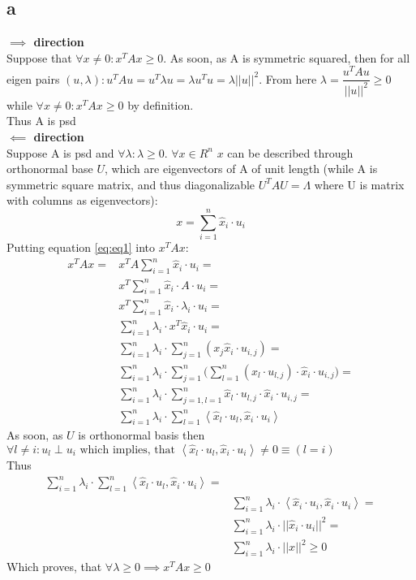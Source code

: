 \subsection*{a}
\textbf{$\implies$ direction}\\
Suppose that $\forall x \neq 0: x^T A x\geq 0$. As soon, as A is symmetric squared, then for all 
eigen pairs $(u,\lambda) : u^T A u = u^T \lambda u = \lambda u^Tu = \lambda ||u||^2$.
From here $\lambda = \dfrac{u^T A u}{||u||^2} \geq 0$ while  $\forall x \neq 0: x^T A x\geq 0$ 
by definition.\\
Thus A is psd\\
\textbf{$\impliedby$ direction}\\
Suppose A is psd and $\forall \lambda: \lambda \geq 0$.
$\forall x \in R^n$ $x$ can be described through orthonormal base $U$, which are eigenvectors
of A of unit length (while A is symmetric square matrix, and thus diagonalizable $U^TAU = \Lambda$
where U is matrix with columns as eigenvectors):
\begin{equation}
	x = \sum_{i=1}^n{\hat{x}_i \cdot u_i}\label{eq:eq1}
\end{equation}
Putting equation \eqref{eq:eq1} into $x^TAx$:
\begin{equation*}
	\begin{aligned}
		x^T A x = & x^T A \sum_{i=1}^n{\hat{x}_i \cdot u_i} = \\
		& x^T \sum_{i=1}^n{\hat{x}_i \cdot A\cdot u_i} = \\
		& x^T \sum_{i=1}^n{\hat{x}_i \cdot \lambda_i\cdot u_i}= \\
		& \sum_{i=1}^n{\lambda_i\cdot x^T \hat{x}_i \cdot  u_i} = \\
		& \sum_{i=1}^n\lambda_i\cdot \sum_{j=1}^n (x_j \hat{x}_i \cdot  u_{i,j}) = \\
		& \sum_{i=1}^n{\lambda_i\cdot \sum_{j=1}^n (\sum_{l=1}^n
			(\hat{x}_l\cdot u_{l,j}) \cdot \hat{x}_i \cdot  u_{i,j}})=\\ 
		& \sum_{i=1}^n{\lambda_i\cdot \sum_{j=1, l=1}^n \hat{x}_l\cdot u_{l,j} \cdot \hat{x}_i \cdot  u_{i,j}} = \\
		& \sum_{i=1}^n{\lambda_i\cdot \sum_{l=1}^n \left<\hat{x}_l\cdot u_l ,\hat{x}_i \cdot  u_i\right>}
	\end{aligned}
\end{equation*}
As soon, as $U$ is orthonormal basis then $\forall l \neq i: u_l \perp u_i 
\text{ which implies, that }  \left<\hat{x}_l\cdot u_l ,\hat{x}_i \cdot  u_i\right> \neq 0 \equiv (l = i)$\\ 
Thus 
\begin{align*}
 	\sum_{i=1}^n{\lambda_i\cdot \sum_{l=1}^n \left<\hat{x}_l\cdot u_l ,\hat{x}_i \cdot  u_i\right>} =\\
		&\sum_{i=1}^n{\lambda_i\cdot \left<\hat{x}_i\cdot u_i ,\hat{x}_i \cdot  u_i\right>}=\\
		&\sum_{i=1}^n\lambda_i\cdot ||\hat{x}_i \cdot u_i||^2 =\\
		&\sum_{i=1}^n\lambda_i\cdot ||x||^2 \geq 0
\end{align*}
Which proves, that $\forall \lambda \geq 0 \implies x^TAx \geq 0 $
